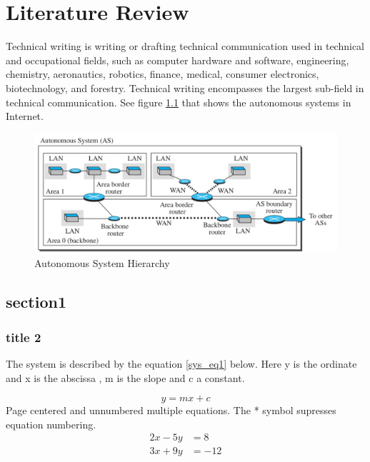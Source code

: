 \chapter{Literature Review}
Technical writing is writing or drafting technical communication used in technical and occupational fields\cite{india}, such as computer hardware and software\cite{rpi}, engineering, chemistry, aeronautics, robotics, finance\cite{japan}, medical, consumer electronics, biotechnology, and forestry. Technical writing encompasses the largest sub-field in technical communication. See figure \ref{net2} that shows the autonomous systems in Internet.

\begin{figure}[h!]
	\centering
	\includegraphics[width=0.9\linewidth]{ospf}
	\caption{Autonomous System Hierarchy}
	\label{net2}
\end{figure}

\section{section1}
\lipsum[2] %


\subsection{title 2}
\lipsum[3] %

\noindent The system is described by the equation \ref{sys_eq1} below. Here y is the ordinate and x is the abscissa , m is the slope and c a constant.

\begin{equation} \label{sys_eq1}
y = mx + c
\end{equation}
\noindent Page centered and unnumbered multiple equations. The * symbol supresses equation numbering.
\begin{align*}
2x - 5y &=  8 \\ 
3x + 9y &=  -12
\end{align*}


